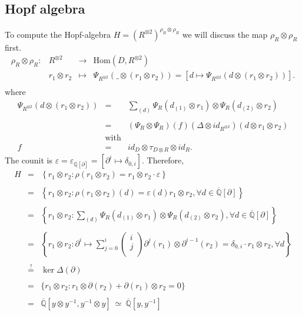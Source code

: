 \documentclass[10pt,a4paper]{article}
\newcommand{\eps}{\varepsilon}
\newcommand{\qz}{{\mathbb{Q}}}
\newcommand{\qzcl}{\overline{\qz}}
\newcommand{\bao}[1]{\begin{array}{#1}}
\newcommand{\ea}{\end{array}}
\newcommand{\tenso}[2]{#1^{\otimes #2}}
\newcommand{\twotenso}[1]{\tenso{#1}{2}}
\begin{document}
\subsection{Hopf algebra}
To compute the Hopf-algebra $H = \left(\twotenso{R}\right)^{\rho_R \otimes \rho_R}$ we will discuss the map $\rho_R \otimes \rho_R$ first.
$$\bao{rrcl}
\rho_R \otimes \rho_R : &\twotenso{R}& \longrightarrow &\mathrm{Hom}\left(D, \twotenso{R}\right)\\
&r_1 \otimes r_2 &\longmapsto &\Psi_{\twotenso{R}}\left(\_ \otimes\left(r_1 \otimes r_2\right)\right) = \left[d \longmapsto \Psi_{\twotenso{R}}\left(d \otimes \left(r_1 \otimes r_2\right)\right)\right].\\
\ea$$
where
$$\bao{rcl}
\Psi_{\twotenso{R}}\left(d \otimes \left(r_1 \otimes r_2\right)\right) &=& \sum_{(d)} \Psi_R\left(d_{(1)} \otimes r_1\right) \otimes \Psi_R\left(d_{(2)} \otimes r_2\right)\\
&&\\
& =& \left(\Psi_R \otimes \Psi_R\right)(f)(\Delta \otimes id_{R^{\otimes2}})(d \otimes r_1 \otimes r_2)\\
&\mathrm{with}&\\
f &=& id_D \otimes \tau_{D\otimes R} \otimes id_R.\ea$$
The counit is $\eps = \eps_{\qzcl[\partial]} = [\partial^i \longmapsto \delta_{0,i}]$. Therefore,
$$\bao{rcl}
H &=& \left\{r_1 \otimes r_2 : \rho(r_1 \otimes r_2) = r_1 \otimes r_2 \cdot \eps\right\}\\
&&\\
&=& \left\{r_1 \otimes r_2 : \rho(r_1 \otimes r_2) (d) = \eps(d) r_1 \otimes r_2, \forall d \in \qzcl[\partial]\right\}\\
&&\\
&=& \left\{r_1 \otimes r_2 : \sum_{(d)} \Psi_R(d_{(1)} \otimes r_1) \otimes \Psi_R(d_{(2)} \otimes r_2),\forall d \in \qzcl[\partial]\right\}\\
&&\\
&=& \left\{r_1 \otimes r_2 : \partial^i \longmapsto \sum_{j=0}^i \left(\bao{c}i\\j\\\ea\right) \partial^j (r_1) \otimes \partial^{i-1}(r_2) = \delta_{0,i} \cdot r_1 \otimes r_2,\forall d\right\}\\
&&\\
&\stackrel{?}{=}& \ker \Delta(\partial)\\
&&\\
& =& \{r_1 \otimes r_2 : r_1 \otimes \partial(r_2) + \partial(r_1) \otimes r_2 = 0\}\\
&&\\
&=& \qzcl[y\otimes y^{-1}, y^{-1} \otimes y]\ \simeq \ \qzcl[y,y^{-1}]\\
\ea$$
\end{document}
